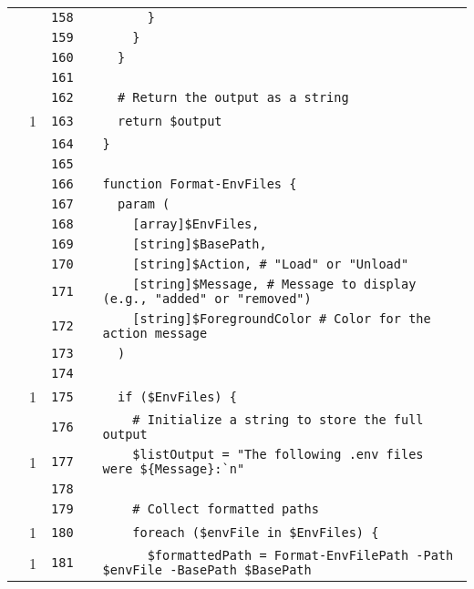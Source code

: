 \documentclass[a4paper,landscape,10pt]{article}
\begin{document}
\begin{longtable}[l]{lrrll}
\cellcolor{gray} &  & \verb~158~ & & \verb~      }~\\
\cellcolor{gray} &  & \verb~159~ & & \verb~    }~\\
\cellcolor{gray} &  & \verb~160~ & & \verb~  }~\\
\cellcolor{gray} &  & \verb~161~ & & \verb~~\\
\cellcolor{gray} &  & \verb~162~ & & \verb~  # Return the output as a string~\\
\cellcolor{green} & 1 & \verb~163~ & & \verb~  return $output~\\
\cellcolor{gray} &  & \verb~164~ & & \verb~}~\\
\cellcolor{gray} &  & \verb~165~ & & \verb~~\\
\cellcolor{gray} &  & \verb~166~ & & \verb~function Format-EnvFiles {~\\
\cellcolor{gray} &  & \verb~167~ & & \verb~  param (~\\
\cellcolor{gray} &  & \verb~168~ & & \verb~    [array]$EnvFiles,~\\
\cellcolor{gray} &  & \verb~169~ & & \verb~    [string]$BasePath,~\\
\cellcolor{gray} &  & \verb~170~ & & \verb~    [string]$Action, # "Load" or "Unload"~\\
\cellcolor{gray} &  & \verb~171~ & & \verb~    [string]$Message, # Message to display (e.g., "added" or "removed")~\\
\cellcolor{gray} &  & \verb~172~ & & \verb~    [string]$ForegroundColor # Color for the action message~\\
\cellcolor{gray} &  & \verb~173~ & & \verb~  )~\\
\cellcolor{gray} &  & \verb~174~ & & \verb~~\\
\cellcolor{green} & 1 & \verb~175~ & & \verb~  if ($EnvFiles) {~\\
\cellcolor{gray} &  & \verb~176~ & & \verb~    # Initialize a string to store the full output~\\
\cellcolor{green} & 1 & \verb~177~ & & \verb~    $listOutput = "The following .env files were ${Message}:`n"~\\
\cellcolor{gray} &  & \verb~178~ & & \verb~~\\
\cellcolor{gray} &  & \verb~179~ & & \verb~    # Collect formatted paths~\\
\cellcolor{green} & 1 & \verb~180~ & & \verb~    foreach ($envFile in $EnvFiles) {~\\
\cellcolor{green} & 1 & \verb~181~ & & \verb~      $formattedPath = Format-EnvFilePath -Path $envFile -BasePath $BasePath~\\

\end{longtable}
\end{document}
